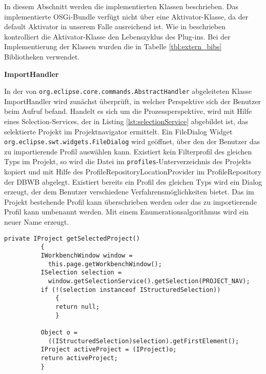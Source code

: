 {{{{In diesem Abschnitt werden die implementierten Klassen beschrieben. Das implementierte OSGi-Bundle verfügt nicht über eine Aktivator-Klasse, da der default Aktivator in unserem Falle ausreichend ist. Wie in \cite[S.70]{BertholdDaum} beschrieben kontrolliert die Aktivator-Klasse den Lebenszyklus des Plug-ins. Bei der Implementierung der Klassen wurden die in Tabelle \ref{tbl:extern_bibs} Bibliotheken verwendet.

\textbf{ImportHandler}{

In der von \texttt{org.eclipse.core.commands.AbstractHandler} abgeleiteten Klasse ImportHandler wird zunächst überprüft, in welcher Perspektive sich der Benutzer beim Aufruf befand. Handelt es sich um die Prozessperspektive, wird mit Hilfe eines Selection-Services, der in Listing \ref{lst:selectionService} abgebildet ist, das selektierte Projekt im Projektnavigator ermittelt. Ein FileDialog Widget \texttt{org.eclipse.swt.widgets.FileDialog} wird geöffnet, über den der Benutzer das zu importierende Profil auswählen kann. Existiert kein Filterprofil des gleichen Typs im Projekt, so wird die Datei im \texttt{profiles}-Unterverzeichnis des Projekts kopiert und mit Hilfe des ProfileRepositoryLocationProvider im ProfileRepository der \ac{DBWB} abgelegt. Existiert bereits ein Profil des gleichen Typs wird ein Dialog erzeugt, der dem Benutzer verschiedene Verfahrensmöglichkeiten bietet. Das im Projekt bestehende Profil kann überschrieben werden oder das zu importierende Profil kann umbenannt werden. Mit einem Enumerationsalgorithmus wird ein neuer Name erzeugt.

 \begin{lstlisting}[caption={Nutzung eines Selection Services, um das gewähle Projekt zu ermitteln},label=lst:selectionService]
  private IProject getSelectedProject()
          {
          IWorkbenchWindow window = 
          	this.page.getWorkbenchWindow();
          ISelection selection = 
          	window.getSelectionService().getSelection(PROJECT_NAV);
          if (!(selection instanceof IStructuredSelection))
              {
              return null;
              }
  
          Object o = 
          	((IStructuredSelection)selection).getFirstElement();
          IProject activeProject = (IProject)o;
          return activeProject;
          }
 \end{lstlisting}








}

}}}}
